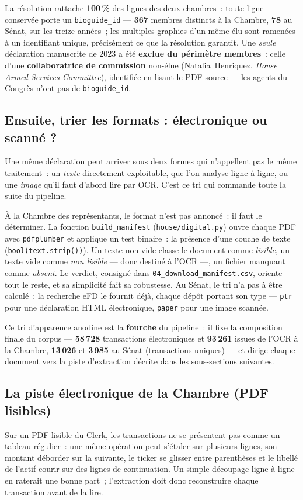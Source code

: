 \documentclass[11pt,a4paper]{article}
\newcommand{\co}[1]{\texttt{\small #1}}
\begin{document}
La résolution rattache \textbf{100\,\%} des lignes des deux chambres~: toute ligne conservée porte un
\co{bioguide_id} — \textbf{367} membres distincts à la Chambre, \textbf{78} au Sénat, sur les treize
années~; les multiples graphies d'un même élu sont ramenées à un identifiant unique, précisément ce que la
résolution garantit. Une \emph{seule} déclaration manuscrite de 2023 a été \textbf{exclue du périmètre
membres}~: celle d'une \textbf{collaboratrice de commission} non-élue (Natalia~Henriquez, \emph{House Armed
Services Committee}), identifiée en lisant le PDF source — les agents du Congrès n'ont pas de
\co{bioguide_id}.

\subsection{Ensuite, trier les formats : électronique ou scanné ?}
\label{sec:tri}
Une même déclaration peut arriver sous deux formes qui n'appellent pas le même traitement~: un
\emph{texte} directement exploitable, que l'on analyse ligne à ligne, ou une \emph{image} qu'il faut
d'abord lire par OCR. C'est ce tri qui commande toute la suite du pipeline.

À la Chambre des représentants, le format n'est pas annoncé~: il faut le déterminer. La fonction
\co{build_manifest} (\co{house/digital.py}) ouvre chaque PDF avec \co{pdfplumber} et applique un test
binaire~: la présence d'une couche de texte (\co{bool(text.strip())}). Un texte non vide classe le document comme
\emph{lisible}, un texte vide comme \emph{non lisible} — donc destiné à l'OCR —, un fichier manquant comme
\emph{absent}. Le verdict, consigné dans \co{04_download_manifest.csv}, oriente tout le reste, et sa
simplicité fait sa robustesse. Au Sénat, le tri n'a pas à être calculé~: la recherche eFD le fournit déjà,
chaque dépôt portant son type — \co{ptr} pour une déclaration HTML électronique, \co{paper} pour une image
scannée.

Ce tri d'apparence anodine est la \textbf{fourche} du pipeline~: il fixe la composition finale du corpus —
\textbf{58\,728} transactions électroniques et \textbf{93\,261} issues de l'OCR à la Chambre,
\textbf{13\,026} et \textbf{3\,985} au Sénat (transactions uniques) — et dirige chaque document vers la
piste d'extraction décrite dans les sous-sections suivantes.

\subsection{La piste électronique de la Chambre (PDF lisibles)}
\label{sec:hdig}
Sur un PDF lisible du Clerk, les transactions ne se présentent pas comme un tableau régulier~: une même
opération peut s'étaler sur plusieurs lignes, son montant déborder sur la suivante, le ticker se glisser
entre parenthèses et le libellé de l'actif courir sur des lignes de continuation. Un simple découpage ligne
à ligne en raterait une bonne part~; l'extraction doit donc reconstruire chaque transaction avant de la
lire.
\end{document}
